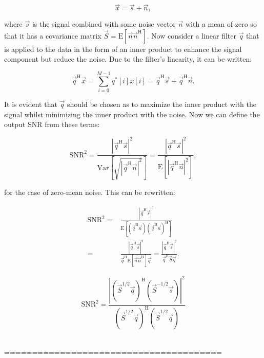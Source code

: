 \documentclass[aps,prd,nofootinbib,twocolumn,reprint,superscriptaddress,showpacs,showkeys,longbibliography]{revtex4-1}
\begin{document}
\begin{equation}
\vec{x} = \vec{s} + \vec{n},
\end{equation}

where $\vec{s}$ is the signal combined with some noise vector $\vec{n}$ with a mean of zero so that it has a covariance matrix $\vec{S}=\text{E}\left[\vec{n}\vec{n}^{\text{H}}\right]$.
Now consider a linear filter $\vec{q}$ that is applied to the data in the form of an inner product to enhance the signal component but reduce the noise.
Due to the filter's linearity, it can be written:

\begin{equation}
\vec{q}^{\text{H}}\vec{x} = \sum_{i=0}^{M-1} q^{\ast}[i]x[i] = \vec{q}^{\text{H}}\vec{s} + \vec{q}^{\text{H}}\vec{n}.
\end{equation}

It is evident that $\vec{q}$ should be chosen as to maximize the inner product with the signal whilst minimizing the inner product with the noise.
Now we can define the output SNR from these terms: 

\begin{equation}
\text{SNR}^{2} = \frac{|\vec{q}^{\text{H}}\vec{s}|^{2}}{\text{Var}\left[\sqrt{|\vec{q}^{\text{H}}\vec{n}|^{2}}\right]} = \frac{|\vec{q}^{\text{H}}\vec{s}|^{2}}{\text{E}\left[|\vec{q}^{\text{H}}\vec{n}|^{2}\right]},
\end{equation}

for the case of zero-mean noise.
This can be rewritten:

\begin{equation}
\begin{split}
\text{SNR}^{2} = & \frac{|\vec{q}^{\text{H}}\vec{s}|^{2}}{\text{E}\left[(\vec{q}^{\text{H}}\vec{n})(\vec{q}^{\text{H}}\vec{n})^{\text{H}}\right]} \\ 
= & \frac{|\vec{q}^{\text{H}}\vec{s}|^{2}}{\vec{q}^{\text{H}}\text{E}\left[\vec{n}\vec{n}^{\text{H}}\right]\vec{q}} = \frac{|\vec{q}^{\text{H}}\vec{s}|^{2}}{\vec{q}^{\text{H}}\vec{S}\vec{q}}.
\end{split}
\end{equation}



\begin{equation}
\text{SNR}^{2} = \frac{|(\vec{S}^{1/2}\vec{q})^{\text{H}}(\vec{S}^{-1/2}\vec{s})|^{2}}{(\vec{S}^{1/2}\vec{q})^{\text{H}}(\vec{S}^{1/2}\vec{q})}
\end{equation}

\ \\
=======================================
\end{document}

